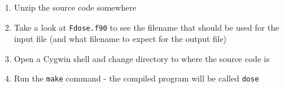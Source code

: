 \documentclass[10pt,a4paper]{article}
\newcommand{\bslash}{\symbol{92}}
\begin{document}
\begin{enumerate}

\item Unzip the source code somewhere

\item Take a look at \texttt{F{\bslash}dose.f90} to see the filename that should be used for the 
input file (and what filename to expect for the output file)

\item Open a Cygwin shell and change directory to where the source code is

\item Run the \texttt{make} command - the compiled program will be called \texttt{dose}

\end{enumerate}



\end{document}

